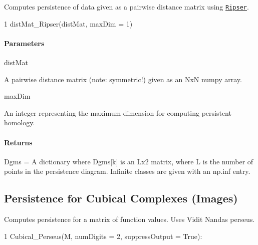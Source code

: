 Computes persistence of data given as a pairwise distance matrix using \href{https://github.com/Ripser/ripser}{\tt Ripser}.


\begin{DoxyCode}
1 distMat\_Ripser(distMat, maxDim = 1)
\end{DoxyCode}


\paragraph*{Parameters}


\begin{DoxyItemize}
\item dist\+Mat
\begin{DoxyItemize}
\item A pairwise distance matrix (note\+: symmetric!) given as an NxN numpy array.
\end{DoxyItemize}
\item max\+Dim
\begin{DoxyItemize}
\item An integer representing the maximum dimension for computing persistent homology.
\end{DoxyItemize}
\end{DoxyItemize}

\paragraph*{Returns}


\begin{DoxyItemize}
\item Dgms = A dictionary where Dgms\mbox{[}k\mbox{]} is an Lx2 matrix, where L is the number of points in the persistence diagram. Infinite classes are given with an np.\+inf entry.
\end{DoxyItemize}





\subsection*{Persistence for Cubical Complexes (Images)}

Computes persistence for a matrix of function values. Uses Vidit Nanda\textquotesingle{}s perseus.


\begin{DoxyCode}
1 Cubical\_Perseus(M, numDigits = 2, suppressOutput = True):
\end{DoxyCode}


